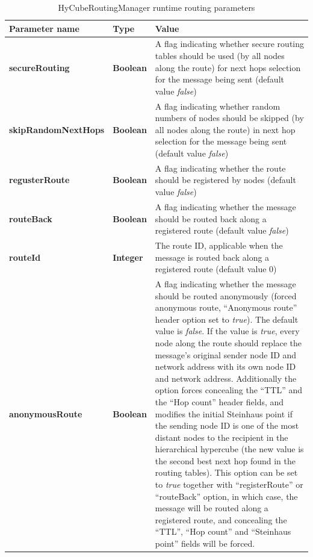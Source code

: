 \begin{table}
\scriptsize
\begin{center}
\begin{tabular}{p{3cm} p{2cm} p{9.5cm}}
	\hline
	\textbf{Parameter name}					& \textbf{Type}					& \textbf{Value}					\\[1mm]
    \hline
	\textbf{secureRouting}					& \textbf{Boolean}				& A flag indicating whether secure routing tables should be used (by all nodes along the route) for next hops selection for the message being sent	(default value \emph{false})		\\[1.5mm]
	\textbf{skipRandomNextHops}				& \textbf{Boolean}				& A flag indicating whether random numbers of nodes should be skipped (by all nodes along the route) in next hop selection for the message being sent	(default value \emph{false})		\\[1.5mm]
	\textbf{regusterRoute}					& \textbf{Boolean}				& A flag indicating whether the route should be registered by nodes (default value \emph{false})							\\[1.5mm]
	\textbf{routeBack}						& \textbf{Boolean}				& A flag indicating whether the message should be routed back along a registered route (default value \emph{false})			\\[1.5mm]
	\textbf{routeId}						& \textbf{Integer}				& The route ID, applicable when the message is routed back along a registered route (default value 0)						\\[1.5mm]
	\textbf{anonymousRoute}					& \textbf{Boolean}				& A flag indicating whether the message should be routed anonymously (forced anonymous route, ``Anonymous route'' header option set to \emph{true}). The default value is \emph{false}. If the value is \emph{true}, every node along the route should replace the message's original sender node ID and network address with its own node ID and network address. Additionally the option forces concealing the ``TTL'' and the ``Hop count'' header fields, and modifies the initial Steinhaus point if the sending node ID is one of the most distant nodes to the recipient in the hierarchical hypercube (the new value is the second best next hop found in the routing tables). This option can be set to \emph{true} together with ``registerRoute'' or ``routeBack'' option, in which case, the message will be routed along a registered route, and concealing the ``TTL'', ``Hop count'' and ``Steinhaus point'' fields will be forced.							\\[1.5mm]
    \hline
\end{tabular}
\end{center}
\caption{HyCubeRoutingManager runtime routing parameters}
\label{tab:libHyCubeRoutingManagerRoutingParameters}
\end{table}





